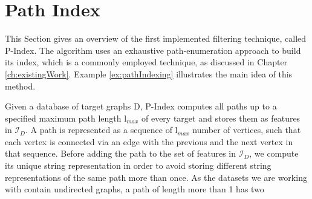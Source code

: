 \documentclass{l4proj}
\newcommand{\fancyI}{\mathcal{I}}
\begin{document}

    
\section{Path Index}
\label{path-index}
This Section gives an overview of the first implemented filtering technique, called P-Index. The algorithm uses an exhaustive path-enumeration approach to build its index, which is a commonly employed technique, as discussed in Chapter \ref{ch:existingWork}. Example \ref{ex:pathIndexing} illustrates the main idea of this method.

Given a database of target graphs D, P-Index computes all paths up to a specified maximum path length l$_{max}$ of every target and stores them as features in $\fancyI_{D}$. A path is represented as a sequence of l$_{max}$ number of vertices, such that each vertex is connected via an edge with the previous and the next vertex in that sequence. Before adding the path to the set of features in $\fancyI_{D}$, we compute its unique string representation in order to avoid storing different string representations of the same path more than once. As the datasets we are working with contain undirected graphs, a path of length more than 1 has two 
\end{document}
